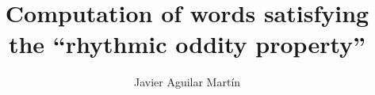 \documentclass{beamer}
\title{Computation of words satisfying the “rhythmic oddity property”}
\author{Javier Aguilar Martín}
\institute{Universidad de Sevilla}
\date{}
\theoremstyle{definition}
\begin{document}
\frame{\titlepage}
%
%
% 
% 
% 
% 



\newcommand{\seti}{\setcounter{saveenumi}{\value{enumi}}}
\newcommand{\conti}{\setcounter{enumi}{\value{saveenumi}}}
\end{document}
